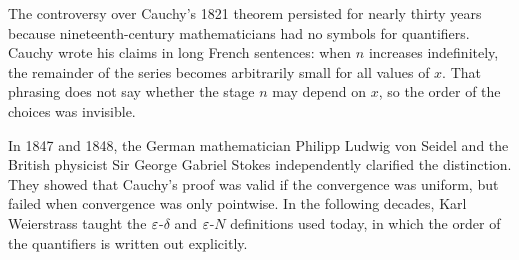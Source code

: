 \begin{historybox}
The controversy over Cauchy's 1821 theorem persisted for nearly thirty years because nineteenth-century mathematicians had no symbols for quantifiers. Cauchy wrote his claims in long French sentences: when $n$ increases indefinitely, the remainder of the series becomes arbitrarily small for all values of $x$. That phrasing does not say whether the stage $n$ may depend on $x$, so the order of the choices was invisible.

In 1847 and 1848, the German mathematician Philipp Ludwig von Seidel and the British physicist Sir George Gabriel Stokes independently clarified the distinction. They showed that Cauchy's proof was valid if the convergence was uniform, but failed when convergence was only pointwise. In the following decades, Karl Weierstrass taught the $\varepsilon$-$\delta$ and $\varepsilon$-$N$ definitions used today, in which the order of the quantifiers is written out explicitly.


\end{historybox}
